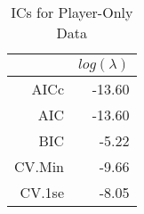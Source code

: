\begin{table}[ht]
\centering
\begin{tabular}{rr}
  \hline
 & $log(\lambda)$ \\ 
  \hline
AICc & -13.60 \\ 
  AIC & -13.60 \\ 
  BIC & -5.22 \\ 
  CV.Min & -9.66 \\ 
  CV.1se & -8.05 \\ 
   \hline
\end{tabular}
\caption{ICs for Player-Only Data} 
\label{tab:pl_ic}
\end{table}
